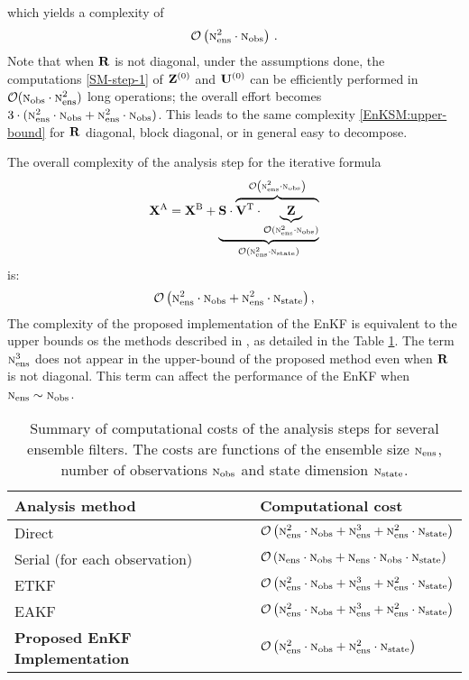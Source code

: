 \documentclass[12pt]{article}
\newcommand{\Nobs}{\textsc{n}_{{\rm obs}}}
\newcommand{\Nens}{\textsc{n}_{{\rm ens}}}
\newcommand{\Nstate}{\textsc{n}_{{\rm state}}}
\newcommand{\BO}{{\mathcal O}}
\newcommand{\XA}{{\bf X}^{\rm A}}
\newcommand{\XB}{{\bf X}^{\rm B}}
\newcommand{\R}{{\bf R}}
\renewcommand{\S}{{\bf S}}
\newcommand{\Z}{{\bf Z}}
\newcommand{\sZ}[1]{{\bf Z}^{\left(\rm #1 \right)}}
\newcommand{\U}[1]{{\bf U}^{\left ( \rm #1 \right)}}
\newcommand{\V}{{\bf V}}
\begin{document}
which yields a complexity of
\begin{eqnarray}
\label{EnKSM:upper-bound} 
\BO \left( \Nens^2 \cdot \Nobs \right )\,.
\end{eqnarray}
Note that when $\R$ is not diagonal, under the assumptions done, the computations  \eqref{SM-step-1} of $\sZ{0}$ and $\U{0}$ can be efficiently performed in $\BO(\Nobs \cdot \Nens^2)$ long operations;  the overall effort becomes $3 \cdot ( \Nens^2 \cdot \Nobs + \Nens^2 \cdot \Nobs)$. This leads to the same complexity  \eqref{EnKSM:upper-bound} for $\R$ diagonal, block diagonal, or in general easy to decompose. 

The overall complexity of the analysis step for the iterative formula
\begin{eqnarray} \nonumber
\label{EnKSM:long-computations-complexity-analysis}
\displaystyle \XA = \XB + \underbrace{\S \cdot \overbrace{\V^{\rm T} \cdot \underbrace{\Z}_{\BO \left( \Nens^2 \cdot \Nobs \right )}}^{ \BO \left (\Nens^2 \cdot \Nobs \right )}}_{\BO \left( \Nens^2 \cdot \Nstate \right)}
\end{eqnarray}
is:
\begin{eqnarray}
\label{EnKSM:overall-complexity-analysis}
\displaystyle \BO \left ( \Nens^2 \cdot \Nobs + \Nens^2 \cdot \Nstate \right ),
\end{eqnarray}
The complexity of the proposed implementation of the EnKF is equivalent to the upper bounds os the methods described in \cite{Tippett2003}, as detailed in the Table  \ref{Tab:Analysis-Complexity-Contrast}. The term $\Nens^3$ does not appear in the upper-bound of the proposed method even when $\R$ is not diagonal. This term can affect the performance of the EnKF when $\Nens \sim \Nobs$.

\begin{table}[H]
\centering
\begin{tabular}{|l|l|} \hline
\bf Analysis method & \bf Computational cost \\ \hline
Direct \cite{Tippett2003} & $\BO \left( \Nens^2 \cdot \Nobs + \Nens^3 + \Nens^2 \cdot \Nstate\right )$ \\
Serial \cite{Anderson07} (for each observation) & $\BO \left( \Nens \cdot \Nobs + \Nens \cdot \Nobs \cdot \Nstate \right )$ \\
ETKF \cite{Anderson01} & $\BO \left( \Nens^2 \cdot \Nobs + \Nens^3 + \Nens^2 \cdot \Nstate\right )$ \\
EAKF \cite{Anderson01} & $\BO \left( \Nens^2 \cdot \Nobs + \Nens^3 + \Nens^2 \cdot \Nstate\right )$ \\
{\bf Proposed EnKF Implementation} & $\BO \left( \Nens^2 \cdot \Nobs + \Nens^2 \cdot \Nstate\right )$ \\ \hline
\end{tabular}
\caption{Summary of computational costs of the analysis steps for several ensemble filters. The costs are functions of the ensemble size $\Nens$, number of observations $\Nobs$ and state dimension $\Nstate$.}
\label{Tab:Analysis-Complexity-Contrast}
\end{table}
\end{document}

